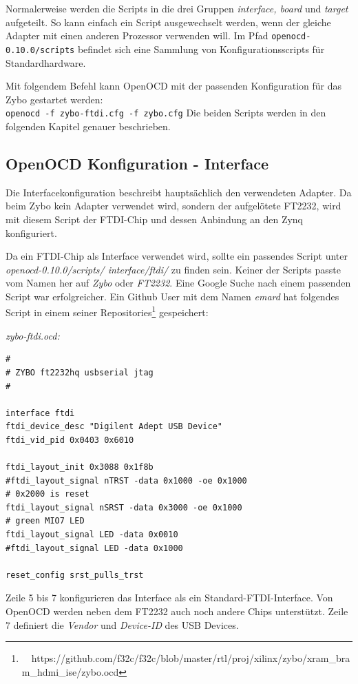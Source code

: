 Normalerweise werden die Scripts in die drei Gruppen \textit{interface, board} und \textit{target} aufgeteilt.
So kann einfach ein Script ausgewechselt werden, wenn der gleiche Adapter mit einen anderen Prozessor verwenden will.
Im Pfad \texttt{openocd-0.10.0/scripts} befindet sich eine Sammlung von Konfigurationsscripts für Standardhardware.

Mit folgendem Befehl kann OpenOCD mit der passenden Konfiguration für das Zybo gestartet werden:\\
\texttt{openocd -f zybo-ftdi.cfg -f zybo.cfg}
Die beiden Scripts werden in den folgenden Kapitel genauer beschrieben.


\subsection{OpenOCD Konfiguration - Interface}
Die Interfacekonfiguration beschreibt hauptsächlich den verwendeten Adapter.
Da beim Zybo kein Adapter verwendet wird, sondern der aufgelötete FT2232, wird mit diesem Script der FTDI-Chip und dessen Anbindung an den Zynq konfiguriert.

Da ein FTDI-Chip als Interface verwendet wird, sollte ein passendes Script unter \textit{openocd-0.10.0/scripts/ interface/ftdi/} zu finden sein.
Keiner der Scripts passte vom Namen her auf \textit{Zybo} oder \textit{FT2232}.
Eine Google Suche nach einem passenden Script war erfolgreicher.
Ein Github User mit dem Namen \textit{emard} hat folgendes Script in einem seiner Repositories\footnote{\ \ https://github.com/f32c/f32c/blob/master/rtl/proj/xilinx/zybo/xram\_bram\_hdmi\_ise/zybo.ocd} gespeichert:

\textit{zybo-ftdi.ocd:}
\lstset{language=tcl}
\begin{lstlisting}[frame=single]
#
# ZYBO ft2232hq usbserial jtag
#

interface ftdi
ftdi_device_desc "Digilent Adept USB Device"
ftdi_vid_pid 0x0403 0x6010

ftdi_layout_init 0x3088 0x1f8b
#ftdi_layout_signal nTRST -data 0x1000 -oe 0x1000
# 0x2000 is reset
ftdi_layout_signal nSRST -data 0x3000 -oe 0x1000
# green MIO7 LED
ftdi_layout_signal LED -data 0x0010
#ftdi_layout_signal LED -data 0x1000

reset_config srst_pulls_trst

\end{lstlisting}

Zeile 5 bis 7 konfigurieren das Interface als ein Standard-FTDI-Interface.
Von OpenOCD werden neben dem FT2232 auch noch andere Chips unterstützt.
Zeile 7 definiert die \textit{Vendor} und \textit{Device-ID} des USB Devices.


